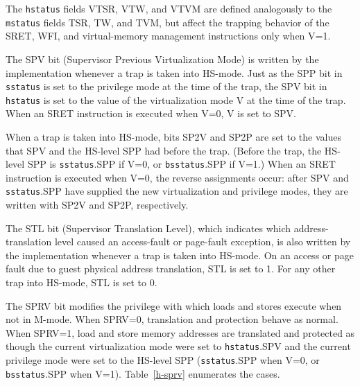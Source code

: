 The {\tt hstatus} fields VTSR, VTW, and VTVM are defined analogously to the
{\tt mstatus} fields TSR, TW, and TVM, but affect the trapping behavior of the
SRET, WFI, and virtual-memory management instructions only when V=1.

The SPV bit (Supervisor Previous Virtualization Mode) is written by the implementation
whenever a trap is taken into HS-mode.  Just as the SPP bit in {\tt sstatus} is set to the privilege
mode at the time of the trap, the SPV bit in {\tt hstatus} is set to the value of the virtualization
mode V at the time of the trap.  When an SRET instruction is executed when V=0,
V is set to SPV.

When a trap is taken into HS-mode, bits SP2V and SP2P are set to the values
that SPV and the HS-level SPP had before the trap.
(Before the trap, the HS-level SPP is {\tt sstatus}.SPP if V=0, or
{\tt bsstatus}.SPP if V=1.)
When an SRET instruction is executed when V=0, the reverse assignments occur:
after SPV and {\tt sstatus}.SPP have supplied the new virtualization and
privilege modes, they are written with SP2V and SP2P, respectively.

The STL bit (Supervisor Translation Level), which indicates which address-translation level
caused an access-fault or page-fault exception, is also written by the implementation whenever a trap
is taken into HS-mode.
On an access or page fault due to guest physical address translation, STL is
set to 1.
For any other trap into HS-mode, STL is set to 0.

The SPRV bit modifies the privilege with which loads and stores execute when
not in M-mode.
When SPRV=0, translation and protection behave as normal.  When SPRV=1,
load and store memory addresses are translated and protected as though
the current virtualization mode were set to {\tt hstatus}.SPV and the current
privilege mode were set to the HS-level SPP ({\tt sstatus}.SPP when V=0, or
{\tt bsstatus}.SPP when V=1).
Table~\ref{h-sprv} enumerates the cases.

